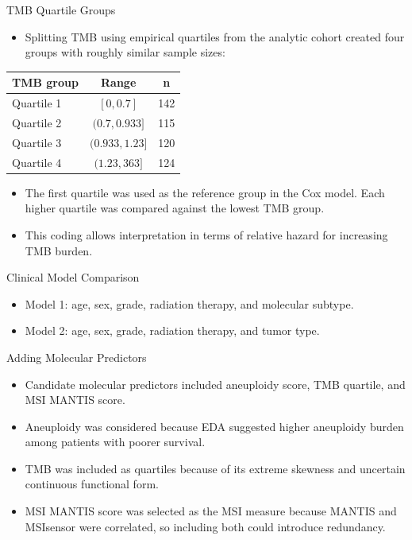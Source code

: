 \documentclass{beamer}
\begin{document}
\begin{frame}{TMB Quartile Groups}
\begin{itemize}
    \item Splitting TMB using empirical quartiles from the analytic cohort created four groups with roughly similar sample sizes:
\end{itemize}

\vspace{0.3cm}

\centering
\begin{tabular}{lcc}
    \toprule
    TMB group & Range & n \\
    \midrule
    Quartile 1 & $[0, 0.7]$ & 142 \\
    Quartile 2 & $(0.7, 0.933]$ & 115 \\
    Quartile 3 & $(0.933, 1.23]$ & 120 \\
    Quartile 4 & $(1.23, 363]$ & 124 \\
    \bottomrule
\end{tabular}

\vspace{0.3cm}

\begin{itemize}
    \item The first quartile was used as the reference group in the Cox model. Each higher quartile was compared against the lowest TMB group.
    \item This coding allows interpretation in terms of relative hazard for increasing TMB burden.
\end{itemize}
\end{frame}

\begin{frame}{Clinical Model Comparison}
\begin{itemize}
    \item Model 1: age, sex, grade, radiation therapy, and molecular subtype.
    \item Model 2: age, sex, grade, radiation therapy, and tumor type.
\end{itemize}
\end{frame}

\begin{frame}{Adding Molecular Predictors}
\begin{itemize}
   \item Candidate molecular predictors included aneuploidy score, TMB quartile, and MSI MANTIS score.
   \item Aneuploidy was considered because EDA suggested higher aneuploidy burden among patients with poorer survival.
   \item TMB was included as quartiles because of its extreme skewness and uncertain continuous functional form.
   \item MSI MANTIS score was selected as the MSI measure because MANTIS and MSIsensor were correlated, so including both could introduce redundancy.
\end{itemize}
\end{frame}
\end{document}
